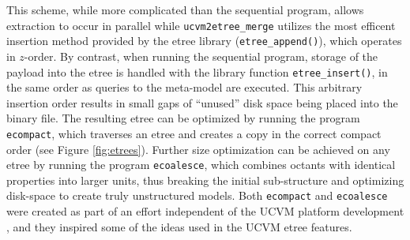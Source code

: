 This scheme, while more complicated than the sequential program, allows extraction to occur in parallel while \texttt{ucvm2etree\_merge} utilizes the most efficent insertion method provided by the etree library (\texttt{etree\_append()}), which operates in $z$-order. By contrast, when running the sequential program, storage of the payload into the etree is handled with the library function \texttt{etree\_insert()}, in the same order as queries to the meta-model are executed. This arbitrary insertion order results in small gaps of ``unused'' disk space being placed into the binary file. The resulting etree can be optimized by running the program \texttt{ecompact}, which traverses an etree and creates a copy in the correct compact order (see Figure \ref{fig:etrees}). Further size optimization can be achieved on any etree by running the program \texttt{ecoalesce}, which combines octants with identical properties into larger units, thus breaking the initial sub-structure and optimizing disk-space to create truly unstructured models. Both \texttt{ecompact} and \texttt{ecoalesce} were created as part of an effort independent of the UCVM platform development \citep{Schlosser_2008_Proc}, and they inspired some of the ideas used in the UCVM etree features.





